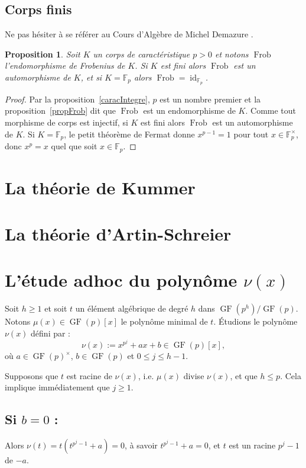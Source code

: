 \documentclass[a4paper, titlepage]{article}
\newtheorem{prop}[theo]{Proposition}
\theoremstyle{definition}
\theoremstyle{remark}
\def\F{\mathbb F}
\def\gf{\operatorname{GF}}
\def\frob{\operatorname{Frob}}
\def\id{\operatorname{id}}
\begin{document}
\subsection{Corps finis}

Ne pas hésiter à se référer au Cours d'Algèbre de Michel Demazure \cite{demazure2008}.

\begin{prop}
Soit $K$ un corps de caractéristique $p > 0$ et notons $\frob$ l'endomorphisme de Frobenius de $K$. Si $K$ est fini alors $\frob$ est un automorphisme de $K$, et si $K = \F_p$ alors $\frob = \id_{\F_p}$.
\end{prop}

\begin{proof}
Par la proposition~\ref{caracIntegre}, $p$ est un nombre premier et la proposition~\ref{propFrob} dit que $\frob$ est un endomorphisme de $K$. Comme tout morphisme de corps est injectif, si $K$ est fini alors $\frob$ est un automorphisme de $K$. Si $K = \F_p$, le petit théorème de Fermat donne $x^{p-1} = 1$ pour tout $x \in \F_p^\times$, donc $x^p =x$ quel que soit $x \in\F_p$.
\end{proof}

\section{La théorie de Kummer}

\section{La théorie d'Artin-Schreier}

\section{L'étude adhoc du polynôme $\nu(x)$}

Soit $h \geqslant 1$ et soit $t$ un élément algébrique de degré $h$ dans $\gf(p^h)/\gf(p)$. Notons $\mu(x) \in \gf(p)[x]$ le polynôme minimal de $t$.
Étudions le polynôme $\nu(x)$ défini par :
$$\nu(x) := x^{p^j} +ax +b \in \gf(p)[x],$$
où $a\in \gf(p)^\times$, $b\in \gf(p)$ et $0\leqslant j \leqslant h-1$.

Supposons que $t$ est racine de $\nu(x)$, i.e. $\mu(x)$ divise $\nu(x)$, et que $h \leqslant p$. Cela implique immédiatement que $j \geqslant 1$.

\subsection*{Si $b = 0$ :}
Alors $\nu(t) = t\left( t^{p^{j}-1} + a\right) =0$, à savoir $t^{p^{j}-1} + a = 0$, et $t$ est un racine ${p^{j}-1}$ de $-a$.
\end{document}
